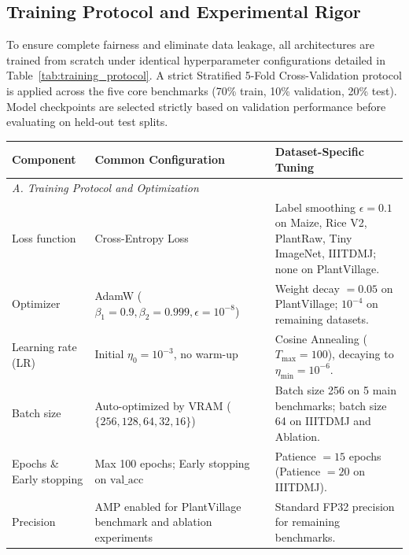 \documentclass[]{interact}
\theoremstyle{plain}
\theoremstyle{definition}
\theoremstyle{remark}
\begin{document}
\subsection{Training Protocol and Experimental Rigor}
\label{subsec:training-protocol}

To ensure complete fairness and eliminate data leakage, all architectures are trained from scratch under identical hyperparameter configurations detailed in Table~\ref{tab:training_protocol}. A strict Stratified 5-Fold Cross-Validation protocol is applied across the five core benchmarks (70\% train, 10\% validation, 20\% test). Model checkpoints are selected strictly based on validation performance before evaluating on held-out test splits.

\begin{table}[H]
\footnotesize
\setlength{\tabcolsep}{3.5pt}
\renewcommand{\arraystretch}{1.10}
{\begin{tabular}{@{}p{3.1cm}p{5.4cm}p{5.7cm}@{}} \toprule
\textbf{Component} & \textbf{Common Configuration} & \textbf{Dataset-Specific Tuning} \\ \midrule
\multicolumn{3}{l}{\textit{A. Training Protocol and Optimization}} \\ \midrule
Loss function & Cross-Entropy Loss & Label smoothing $\epsilon = 0.1$ on Maize, Rice V2, PlantRaw, Tiny ImageNet, IIITDMJ; none on PlantVillage. \\
Optimizer & AdamW ($\beta_1 = 0.9, \beta_2 = 0.999, \epsilon = 10^{-8}$) & Weight decay $= 0.05$ on PlantVillage; $10^{-4}$ on remaining datasets. \\
Learning rate (LR) & Initial $\eta_0 = 10^{-3}$, no warm-up & Cosine Annealing ($T_{\max} = 100$), decaying to $\eta_{\min} = 10^{-6}$. \\
Batch size & Auto-optimized by VRAM ($\{256, 128, 64, 32, 16\}$) & Batch size 256 on 5 main benchmarks; batch size 64 on IIITDMJ and Ablation. \\
Epochs \& Early stopping & Max 100 epochs; Early stopping on $\text{val\_acc}$ & Patience $= 15$ epochs (Patience $= 20$ on IIITDMJ). \\
Precision & AMP enabled for PlantVillage benchmark and ablation experiments & Standard FP32 precision for remaining benchmarks. \\ \bottomrule
\end{tabular}}
\end{table}
\end{document}
